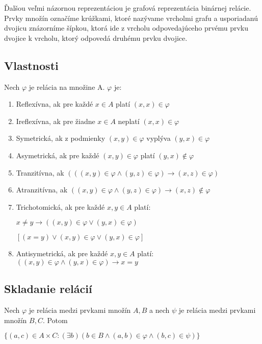 		Ďalšou veľmi názornou reprezentáciou je grafová reprezentácia binárnej relácie. Prvky množín označíme krúžkami, ktoré nazývame vrcholmi grafu a usporiadanú dvojicu znázorníme šípkou, ktorá ide z vrcholu odpovedajúceho prvému prvku dvojice k vrcholu, ktorý odpovedá druhému prvku dvojice.\\

	\subsection*{Vlastnosti}
		Nech  $\varphi$  je relácia na množine A. $\varphi$ je:
		\begin{enumerate}
			\item Reflexívna, ak pre každé $x \in A$ platí $( x, x ) \in \varphi $
			\item Ireflexívna, ak pre žiadne $x \in A$ neplatí $( x, x) \in \varphi $
			\item Symetrická, ak z podmienky $( x, y ) \in \varphi $ vyplýva $( y, x ) \in \varphi$
			\item Asymetrická, ak pre každé $( x, y ) \in \varphi$  platí $( y, x ) \notin \varphi$  
			\item Tranzitívna, ak $(( ( x, y ) \in \varphi  \wedge ( y, z ) \in \varphi ) \rightarrow ( x, z ) \in \varphi )$
			\item Atranzitívna, ak $(( x, y) \in \varphi  \wedge ( y,z) \in \varphi ) \rightarrow ( x,z) \notin \varphi$ 
			\item Trichotomická, ak pre každé $x, y \in A $ platí:

			$x \neq y \rightarrow (( x, y) \in \varphi  \vee ( y, x) \in \varphi ) $ 

			$[ ( x = y) \vee ( x, y) \in \varphi \vee ( y, x) \in \varphi ]$

			\item Antisymetrická, ak pre každé $x, y \in A$ platí:
			$(( x, y) \in \varphi  \wedge ( y, x) \in \varphi ) \rightarrow x = y$
		\end{enumerate}


 	\subsection*{Skladanie relácií}

	  	Nech $\varphi$ je relácia medzi prvkami množín $A, B$ a nech $\psi$ je relácia medzi prvkami množín $B, C$. Potom

		$\{ ( a, c ) \in A \times C : ( \exists b)(b \in B \wedge ( a,b) \in \varphi \wedge ( b, c) \in \psi )\}$

